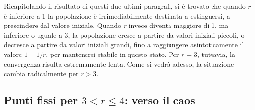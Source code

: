 Ricapitolando il risultato di questi due ultimi paragrafi, si è trovato che quando $r$ è inferiore a 1 la popolazione è irrimediabilmente destinata a estinguersi, a prescindere dal valore iniziale. Quando $r$ invece diventa maggiore di 1, ma inferiore o uguale a 3, la popolazione cresce a partire da valori iniziali piccoli, o decresce a partire da valori iniziali grandi, fino a raggiungere asintoticamente il valore $1-1/r$, per mantenersi stabile in questo stato. Per $r=3$, tuttavia, la convergenza risulta estremamente lenta. Come si vedrà adesso, la situazione cambia radicalmente per $r > 3$.

\subsection{Punti fissi per $3 < r \leq 4$: verso il caos}
\begin{figure}[h!]
    \begin{center}

\end{center}
\end{figure}
